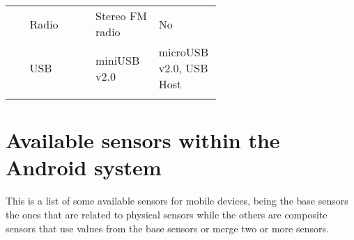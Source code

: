 \begin{longtable}{llp{0.3\linewidth}p{0.3\linewidth}}
         & Radio         & Stereo FM radio                                              & No                                                                                                                                                                                                          \\
         & USB           & miniUSB v2.0                                                 & microUSB v2.0, USB Host                                                                                                                                                                                     \\ \hline
\label{tab:gsmarena-n95-s7}
\end{longtable}

\chapter{Available sensors within the Android system}
\label{ape:android-sensors}

This is a list of some available sensors for mobile devices, being the base sensors the ones that are related to physical sensors while the others are composite sensors that use values from the base sensors or merge two or more sensors.

